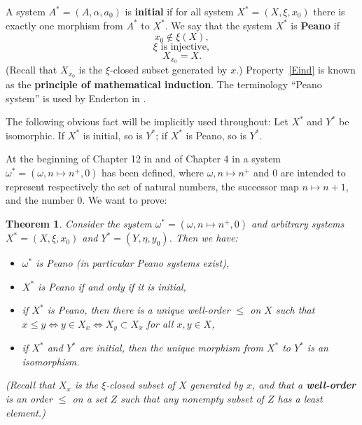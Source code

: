 \documentclass[12pt,letterpaper]{article}
\newtheorem{thm}{Theorem}%
\begin{document}
A system \(A^*=(A,\alpha,a_0)\) is \textbf{initial} if for all system \(X^*=(X,\xi,x_0)\) there is exactly one morphism from \(A^*\) to \(X^*\). We say that the system \(X^*\) is \textbf{Peano} if 
\begin{equation}\label{Edisj}
x_0\notin \xi(X),
\end{equation}
\begin{equation}\label{Einj}
\xi\text{ is injective},
\end{equation}
\begin{equation}\label{Eind}
X_{x_0}=X. 
\end{equation} 
(Recall that \(X_{x_0}\) is the \(\xi\)-closed subset generated by \(x\).) Property~\eqref{Eind} is known as the \textbf{principle of mathematical induction}. The terminology ``Peano system'' is used by Enderton in \cite{Enderton1977}. 

The following obvious fact will be implicitly used throughout: Let \(X^*\) and \(Y^*\) be isomorphic. If \(X^*\) is initial, so is \(Y^*\); if \(X^*\) is Peano, so is \(Y^*\). 

At the beginning of Chapter 12 in \cite{halmos_naive_1974} and of Chapter 4 in \cite{Enderton1977} a system \(\omega^*=(\omega,n\mapsto n^+,0)\) has been defined, where \(\omega,n\mapsto n^+\) and \(0\) are intended to represent respectively the set of natural numbers, the successor map \(n\mapsto n+1\), and the number \(0\). We want to prove: 

\begin{thm}\label{T1} 
Consider the system \(\omega^*=(\omega,n\mapsto n^+,0)\) and arbitrary systems \(X^*=(X,\xi,x_0)\) and \(Y^*=(Y,\eta,y_0)\). Then we have: 
\begin{itemize}
\item[\emph{(a)}] \(\omega^*\) is Peano (in particular Peano systems exist), 
\item[\emph{(b)}] \(X^*\) is Peano if and only if it is initial, 
\item[\emph{(c)}] if \(X^*\) is Peano, then there is a unique well-order \(\le\) on \(X\) such that \(x\le y\Leftrightarrow y\in X_x\Leftrightarrow X_y\subset X_x\) for all \(x,y\in X\),
\item[\emph{(d)}] if \(X^*\) and \(Y^*\) are initial, then the unique morphism from \(X^*\) to \(Y^*\) is an isomorphism.   
\end{itemize} 
(Recall that \(X_x\) is the \(\xi\)-closed subset of \(X\) generated by \(x\), and that a \textbf{well-order} is an order \(\le\) on a set \(Z\) such that any nonempty subset of \(Z\) has a least element.) 
\end{thm} 
\end{document}
